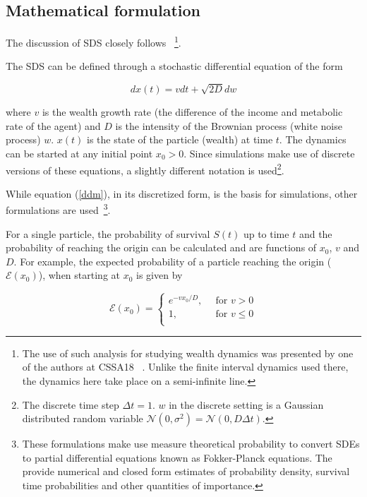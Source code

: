 \subsection{Mathematical formulation}
The discussion of SDS closely follows ~\cite{redner2001guide}\footnote{The use of such analysis for studying wealth dynamics was presented by one of the authors at CSSA18 ~\cite{rv}. Unlike the finite interval dynamics used there, the dynamics here take place on a semi-infinite line.}.

The SDS can be defined through a stochastic differential equation of the form 

\begin{equation}\label{ddm}
dx(t) = vdt + \sqrt{2D} dw
\end{equation}

\noindent where $v$ is the wealth growth rate (the difference of the income and metabolic rate of the agent) and $D$ is the intensity of the Brownian process (white noise process) $w$. $x(t)$ is the state of the particle (wealth) at time $t$. The dynamics can be started at any initial point $x_0 > 0$. Since simulations make use of discrete versions of these equations, a slightly different notation is used\footnote{The discrete time step $\Delta t=1$. $w$ in the discrete setting is a Gaussian distributed random variable $\mathcal{N}(0,\sigma^2) = \mathcal{N}(0,D\Delta t)$.}.

While equation (\ref{ddm}), in its discretized form, is the basis for simulations, other formulations are used~\cite{redner2001guide,rv}\footnote{These formulations make use measure theoretical probability to convert SDEs to partial differential equations known as Fokker-Planck equations.  The provide numerical and closed form estimates of probability density, survival time probabilities and other quantities of importance.}.

For a single particle, the probability of survival $S(t)$ up to time $t$ and the probability of reaching the origin can be calculated and are functions of $x_0$, $v$ and $D$. For example, the expected probability of a particle reaching the origin ($\mathcal{E}(x_0)$), when starting at $x_0$ is given by 

\begin{equation}\label{e}
\mathcal{E}(x_0) = \begin{cases}
e^{-v x_0/D} \text{, } & \text{ for } v > 0 \\
1 \text{, } & \text{ for } v \leq 0 \\
\end{cases}
\end{equation}  

